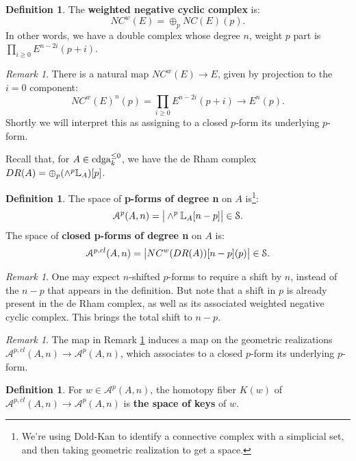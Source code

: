 \documentclass[10pt,a4paper,reqno,oneside]{book} %
\theoremstyle{plain}
\theoremstyle{definition}
\newtheorem{defin}[thm]{Definition}
\theoremstyle{remark}
\newtheorem{rem}[thm]{Remark}
\numberwithin{equation}{section}
\begin{document}
\begin{defin}
The \textbf{weighted negative cyclic complex} is:
\[	NC^w(E) = \oplus_p NC(E)(p).	\]
In other words, we have a double complex whose degree $n$, weight $p$ part is $\prod_{i\geq 0}
E^{n-2i}(p+i)$.
\end{defin}


\begin{rem}
\label{rem:underlying_form}
There is a natural map $NC^w(E) \to E$, given by projection to the $i=0$ component:
\[	NC^w(E)^n(p) = \prod_{i\geq 0} E^{n-2i}(p+i) \to E^n(p) .	\]
Shortly we will interpret this as assigning to a closed $p$-form its underlying $p$-form.
\end{rem}

Recall that, for $A \in \operatorname{cdga}_k^{\leq 0}$, we have the de Rham complex $DR(A) = \oplus_p(\wedge^p \mathbb L_A)[p]$.
\begin{defin}
The space of \textbf{p-forms of degree n} on $A$ is\footnote{We're using Dold-Kan to identify a connective complex
with a simplicial set, and then taking geometric realization to get a space.}:
\[	\mathcal{A}^p(A,n) = \big| \wedge^p \mathbb L_A [n-p] \big| \in \mathcal S.	\]
The space of \textbf{closed p-forms of degree n} on $A$ is:
\[	\mathcal{A}^{p,cl}(A,n) = \big|NC^w(DR(A))[n-p](p) \big| \in \mathcal S.	\]
\end{defin}

\begin{rem}
One may expect $n$-shifted $p$-forms to require a shift by $n$, instead of the $n-p$ that appears in the definition.
But note that a shift in $p$ is already present in the de Rham complex, as well as its associated weighted negative cyclic
complex. This brings the total shift to $n-p$.
\end{rem}

\begin{rem}
The map in Remark \ref{rem:underlying_form} induces a map on the geometric realizations $\mathcal{A}^{p,cl}(A,n)
\to \mathcal{A}^p(A,n)$, which associates to a closed $p$-form its underlying $p$-form.
\end{rem}

\begin{defin}
For $w \in \mathcal{A}^p(A,n)$, the homotopy fiber $K(w)$ of $\mathcal{A}^{p,cl}(A,n) \to \mathcal{A}^p(A,n)$ is
\textbf{the space of keys} of $w$.
\end{defin}
\end{document}
